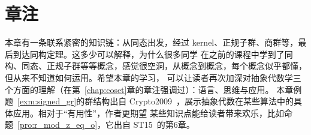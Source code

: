 \fi

\section*{章注}
本章有一条联系紧密的知识链：从同态出发，经过 kernel、正规子群、商群等，最后到达同构定理。这多少可以解释，为什么很多同学
在之前的课程中学到了同构、同态、正规子群等等概念，感觉很空洞，从概念到概念，每个概念似乎都懂，但从来不知道如何运用。希望本章的学习，
可以让读者再次加深对抽象代数学三个方面的理解（在第~\ref{chap:coset}章的章注强调过）：语言、思维与应用。
本章例题~\ref{exm:signed_gr}的群结构出自 Crypto2009~\cite{HK09}，展示抽象代数在某些算法中的具体应用。相对于“有用性”，作者更期望
某些知识点能给读者带来欢乐，比如命题~\ref{pro:r_mod_z_eq_o}，它出自 ST15~\cite{ST15}的第6章。


